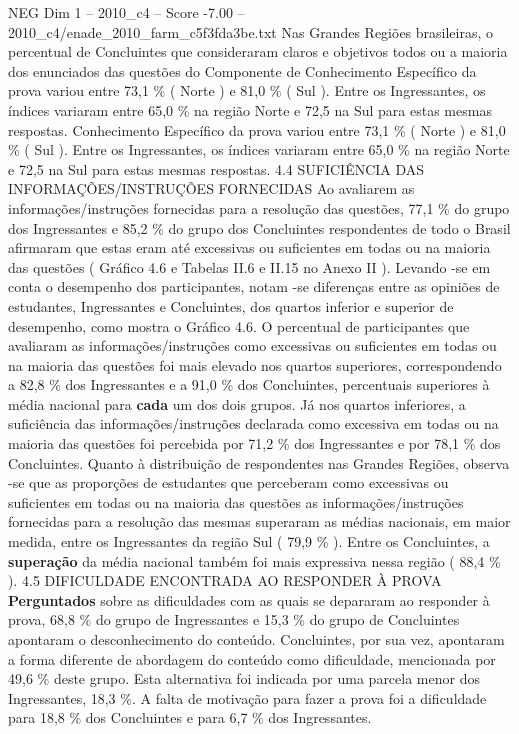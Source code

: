 \begin{textsample}{NEG Dim 1 – 2010\_c4 – Score -7.00 – 2010\_c4/enade\_2010\_farm\_c5f3fda3be.txt}
Nas Grandes Regiões brasileiras, o percentual de Concluintes que consideraram claros e objetivos todos ou a maioria dos enunciados das questões do Componente de Conhecimento Específico da prova variou entre 73,1 \% ( Norte ) e 81,0 \% ( Sul ).
Entre os Ingressantes, os índices variaram entre 65,0 \% na região Norte e 72,5 na Sul para estas mesmas respostas.
Conhecimento Específico da prova variou entre 73,1 \% ( Norte ) e 81,0 \% ( Sul ).
Entre os Ingressantes, os índices variaram entre 65,0 \% na região Norte e 72,5 na Sul para estas mesmas respostas. 4.4 SUFICIÊNCIA DAS INFORMAÇÕES/INSTRUÇÕES FORNECIDAS Ao avaliarem as informações/instruções fornecidas para a resolução das questões, 77,1 \% do grupo dos Ingressantes e 85,2 \% do grupo dos Concluintes respondentes de todo o Brasil afirmaram que estas eram até excessivas ou suficientes em todas ou na maioria das questões ( Gráfico 4.6 e Tabelas II.6 e II.15 no Anexo II ).
Levando -se em conta o desempenho dos participantes, notam -se diferenças entre as opiniões de estudantes, Ingressantes e Concluintes, dos quartos inferior e superior de desempenho, como mostra o Gráfico 4.6.
O percentual de participantes que avaliaram as informações/instruções como excessivas ou suficientes em todas ou na maioria das questões foi mais elevado nos quartos superiores, correspondendo a 82,8 \% dos Ingressantes e a 91,0 \% dos Concluintes, percentuais superiores à média nacional para \textbf{cada} um dos dois grupos.
Já nos quartos inferiores, a suficiência das informações/instruções declarada como excessiva em todas ou na maioria das questões foi percebida por 71,2 \% dos Ingressantes e por 78,1 \% dos Concluintes.
Quanto à distribuição de respondentes nas Grandes Regiões, observa -se que as proporções de estudantes que perceberam como excessivas ou suficientes em todas ou na maioria das questões as informações/instruções fornecidas para a resolução das mesmas superaram as médias nacionais, em maior medida, entre os Ingressantes da região Sul ( 79,9 \% ).
Entre os Concluintes, a \textbf{superação} da média nacional também foi mais expressiva nessa região ( 88,4 \% ). 4.5 DIFICULDADE ENCONTRADA AO RESPONDER À PROVA \textbf{Perguntados} sobre as dificuldades com as quais se depararam ao responder à prova, 68,8 \% do grupo de Ingressantes e 15,3 \% do grupo de Concluintes apontaram o desconhecimento do conteúdo.
Concluintes, por sua vez, apontaram a forma diferente de abordagem do conteúdo como dificuldade, mencionada por 49,6 \% deste grupo.
Esta alternativa foi indicada por uma parcela menor dos Ingressantes, 18,3 \%.
A falta de motivação para fazer a prova foi a dificuldade para 18,8 \% dos Concluintes e para 6,7 \% dos Ingressantes.

\end{textsample}
